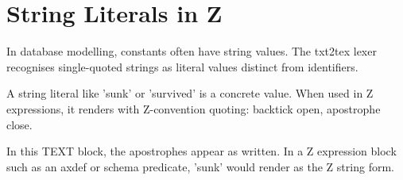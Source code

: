 \documentclass[a4paper,10pt,fleqn]{article}
\begin{document}
\section*{String Literals in Z}

\noindent In database modelling, constants often have string values. The txt2tex lexer recognises single-quoted strings as literal values distinct from identifiers.

\bigskip

\noindent A string literal like 'sunk' or 'survived' is a concrete value. When used in Z expressions, it renders with Z-convention quoting: backtick open, apostrophe close.

\bigskip

\noindent In this TEXT block, the apostrophes appear as written. In a Z expression block such as an axdef or schema predicate, 'sunk' would render as the Z string form.

\bigskip
\end{document}
